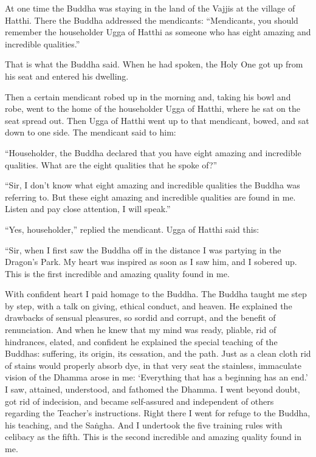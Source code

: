\documentclass[12pt,openany]{book}%
\begin{document}
At one time the Buddha was staying in the land of the Vajjis at the village of Hatthi. There the Buddha addressed the mendicants: “Mendicants, you should remember the householder Ugga of Hatthi as someone who has eight amazing and incredible qualities.” 

That is what the Buddha said. When he had spoken, the Holy One got up from his seat and entered his dwelling. 

Then a certain mendicant robed up in the morning and, taking his bowl and robe, went to the home of the householder Ugga of Hatthi, where he sat on the seat spread out. Then Ugga of Hatthi went up to that mendicant, bowed, and sat down to one side. The mendicant said to him: 

“Householder, the Buddha declared that you have eight amazing and incredible qualities. What are the eight qualities that he spoke of?” 

“Sir, I don’t know what eight amazing and incredible qualities the Buddha was referring to. But these eight amazing and incredible qualities are found in me. Listen and pay close attention, I will speak.” 

“Yes, householder,” replied the mendicant. Ugga of Hatthi said this: 

“Sir, when I first saw the Buddha off in the distance I was partying in the Dragon’s Park. My heart was inspired as soon as I saw him, and I sobered up. This is the first incredible and amazing quality found in me. 

With confident heart I paid homage to the Buddha. The Buddha taught me step by step, with a talk on giving, ethical conduct, and heaven. He explained the drawbacks of sensual pleasures, so sordid and corrupt, and the benefit of renunciation. And when he knew that my mind was ready, pliable, rid of hindrances, elated, and confident he explained the special teaching of the Buddhas: suffering, its origin, its cessation, and the path. Just as a clean cloth rid of stains would properly absorb dye, in that very seat the stainless, immaculate vision of the Dhamma arose in me: ‘Everything that has a beginning has an end.’ I saw, attained, understood, and fathomed the Dhamma. I went beyond doubt, got rid of indecision, and became self-assured and independent of others regarding the Teacher’s instructions. Right there I went for refuge to the Buddha, his teaching, and the \textsanskrit{Saṅgha}. And I undertook the five training rules with celibacy as the fifth. This is the second incredible and amazing quality found in me. 
\end{document}
